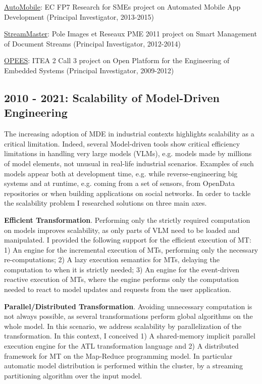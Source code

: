 \documentclass[10pt,a4paper]{article}
\begin{document}
\medskip
{\footnotesize 
    \href{http://automobile.webratio.com/}{AutoMobile}: EC FP7 Research
    for SMEs project on Automated Mobile App Development (Principal
    Investigator, 2013-2015)

    \href{http://www.irccyn.ec-nantes.fr/fr/projets-ivc/projet-streammaster-ivc}{StreamMaster}:
    Pole Images et Reseaux PME 2011 project on Smart Management of
    Document Streams (Principal Investigator, 2012-2014)

    \href{https://itea3.org/project/opees.html}{OPEES}: ITEA 2 Call 3
    project on Open Platform for the Engineering of Embedded Systems
    (Principal Investigator, 2009-2012)
}

\subsection{2010 - 2021: Scalability of Model-Driven Engineering}
The increasing adoption of MDE in industrial contexts highlights scalability as a critical limitation. Indeed, several Model-driven tools show critical efficiency limitations in handling very large models (VLMs), e.g. models made by millions of model elements, not unusual in real-life industrial scenarios. Examples of such models appear both at development time, e.g. while reverse-engineering big systems and at runtime, e.g. coming from a set of sensors, from OpenData repositories or when building applications on social networks. %
In order to tackle the scalability problem I researched solutions on three main axes.

\textbf{Efficient Transformation}. Performing only the strictly required computation on models improves scalability, as only parts of VLM need to be loaded and manipulated. I provided the following support for the efficient execution of MT:
1) An engine for the incremental execution of MTs, performing only the necessary re-computations; 2) A lazy execution semantics for MTs, delaying the computation to when it is strictly needed; 3) An engine for the event-driven reactive execution of MTs, where the engine performs only the computation needed to react to model updates and requests from the user application.

\textbf{Parallel/Distributed Transformation}. Avoiding unnecessary computation is not always possible, as several transformations perform global algorithms on the whole model. In this scenario, we address scalability by parallelization of the transformation. In this context, I conceived 1) A shared-memory implicit parallel execution engine for the ATL transformation language and 2) A distributed framework for MT on the Map-Reduce programming model. In particular automatic model distribution is performed within the cluster, by a streaming partitioning algorithm over the input model.
\end{document}

